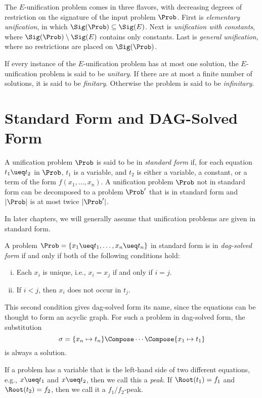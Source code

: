 The $E$-unification problem comes in three flavors, with decreasing degrees of
restriction on the signature of the input problem $\Prob$. First is
\emph{elementary unification}, in which $\Sig(\Prob) \subseteq \Sig(E)$. Next
is \emph{unification with constants}, where $\Sig(\Prob) \setminus \Sig(E)$
contains only constants. Last is \emph{general unification}, where no
restrictions are placed on $\Sig(\Prob)$.

If every instance of the $E$-unification problem has at most one solution, the
$E$-unification problem is said to be \emph{unitary}. If there are at most a
finite number of solutions, it is said to be \emph{finitary}. Otherwise the
problem is said to be \emph{infinitary}.

\section{Standard Form and DAG-Solved Form}\label{sec:std-form}

A unification problem $\Prob$ is said to be in \emph{standard form} if, for
each equation $t_1 \ueq t_2$ in $\Prob$, $t_1$ is a variable, and $t_2$ is
either a variable, a constant, or a term of the form $f(x_1, \dotsc, x_n)$. A
unification problem $\Prob$ not in standard form can be decomposed to a problem
$\Prob'$ that is in standard form and $|\Prob|$ is at most twice $|\Prob'|$.

In later chapters, we will generally assume that unification problems are given
in standard form.

A problem $\Prob = \{ x_1 \ueq t_1, \dotsc, x_n \ueq t_n \}$ in standard form
is in \emph{dag-solved form} if and only if both of the following conditions
hold:

\begin{enumerate}[(i)]
    \item Each $x_i$ is unique, i.e., $x_i = x_j$ if and only if $i = j$.
    \item If $i < j$, then $x_i$ does not occur in $t_j$.
\end{enumerate}

This second condition gives dag-solved form its name, since the equations can
be thought to form an acyclic graph. For such a problem in
dag-solved form, the substitution
\[\sigma = \{ x_n \mapsto t_n \} \Compose \dotsb \Compose \{ x_1 \mapsto t_1 \}\]
is always a solution.

If a problem has a variable that is the left-hand side of two different equations,
e.g., $x \ueq t_1$ and $x \ueq t_2$, then we call this a \emph{peak}. If
$\Root(t_1) = f_1$ and $\Root(t_2) = f_2$, then we call it a $f_1/f_2$-peak.


